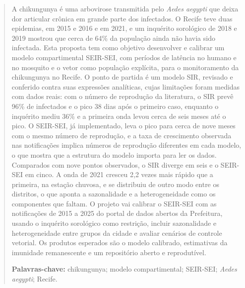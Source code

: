 \begin{abstract}
A chikungunya é uma arbovirose transmitida pelo \textit{Aedes aegypti} que deixa dor articular crônica em
grande parte dos infectados. O Recife teve duas epidemias, em 2015 e 2016 e em 2021, e um inquérito
sorológico de 2018 e 2019 mostrou que cerca de 64\% da população ainda não havia sido infectada. Esta
proposta tem como objetivo desenvolver e calibrar um modelo compartimental SEIR-SEI, com períodos de
latência no humano e no mosquito e o vetor como população explícita, para o monitoramento da chikungunya
no Recife. O ponto de partida é um modelo SIR, revisado e conferido contra suas expressões analíticas, cujas
limitações foram medidas com dados reais: com o número de reprodução da literatura, o SIR prevê 96\% de
infectados e o pico 38 dias após o primeiro caso, enquanto o inquérito mediu 36\% e a primeira onda levou
cerca de seis meses até o pico. O SEIR-SEI, já implementado, leva o pico para cerca de nove meses com o
mesmo número de reprodução, e a taxa de crescimento observada nas notificações implica números de
reprodução diferentes em cada modelo, o que mostra que a estrutura do modelo importa para ler os dados.
Comparados com nove pontos observados, o SIR diverge em seis e o SEIR-SEI em cinco. A onda de 2021 cresceu
2,2 vezes mais rápido que a primeira, na estação chuvosa, e se distribuiu de outro modo entre os
distritos, o que aponta a sazonalidade e a heterogeneidade como os componentes que faltam.
O projeto vai calibrar o SEIR-SEI com as notificações de 2015 a 2025 do portal de dados abertos da
Prefeitura, usando o inquérito sorológico como restrição, incluir sazonalidade e heterogeneidade entre
grupos da cidade e avaliar cenários de controle vetorial. Os produtos esperados são o modelo calibrado,
estimativas da imunidade remanescente e um repositório aberto e reprodutível.

{\raggedright\textbf{Palavras-chave:} chikungunya; modelo compartimental; SEIR-SEI; \textit{Aedes aegypti};
Recife.\par}
\end{abstract}

